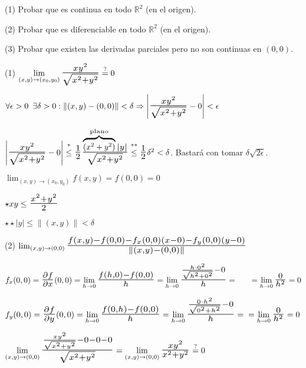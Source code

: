 \documentclass[12pt, titlepage]{article}
\newcommand{\eqc}[1]{\stackrel{\mathclap{\normalfont\mbox{\scriptsize{#1}}}}{=}}
\newcommand{\leqc}[1]{\stackrel{\mathclap{\normalfont\mbox{\scriptsize{#1}}}}{\leq}}
\newcommand{\R}{\mathbb{R}}
\newcommand{\bfrac}[2]{\scalebox{1.4}{$\frac{#1}{#2}$}}
\newcommand{\spac}{\, \, \,}
\begin{document}
(1) Probar que es continua en todo $\R^2$ (en el origen).

(2) Probar que es diferenciable en todo $\R^2$ (en el origen).

(3) Probar que existen las derivadas parciales pero no son continuas en $(0, 0)$.
\vspace{3mm}

(1) $\displaystyle \lim_{(x, y) \to (x_0, y_0)} \bfrac{xy^2}{\sqrt{x^2 + y^2}} \eqc{?} 0$

$\forall \epsilon > 0 \spac \exists \delta > 0 : \|(x , y) - (0, 0)\| < \delta \Rightarrow \left | \bfrac{xy^2}{\sqrt
{x^2 + y^2}} - 0 \right | < \epsilon$
\vspace{3mm}

$\left | \bfrac{xy^2}{\sqrt{x^2 + y^2}} - 0 \right | \leqc{*} \bfrac{1}{2} \bfrac{\overbrace{\scalebox{0.7}{$(x^2 + y^2)$}}^{\text{plano}}|y|}{\sqrt{x^2 + y^2}} \leqc{**} \bfrac{1}{2} \delta^2 < \delta$. Bastará 
con tomar $\delta \sqrt{2 \epsilon}$.
\vspace{3mm}

$\displaystyle \lim_{(x, y) \to (x_0, y_0)} f (x, y) = f (0, 0) = 0$
\vspace{3mm}

$\star xy \leq \bfrac{x^2 + y^2}{2}$
\vspace{2mm}

$\star \star |y| \leq \|(x, y)\| < \delta$
\vspace{5mm}

(2) $\lim_{(x, y) \to (0, 0)} \bfrac{f (x, y) - f (0, 0) - f_x (0, 0) (x - 0) - f_y (0, 0) (y - 0)}{\|(x, y) - (0, 0)\|}$
\vspace{5mm}

$f_x (0, 0) = \bfrac{\partial f}{\partial x} (0, 0) = \displaystyle \lim_{h \to 0} \bfrac{f (h, 0) - f (0, 0)}{h} = 
\lim_{h \to 0} \bfrac{\frac{h \cdot 0^2}{\sqrt{h^2 + 0^2}} - 0}{h} = \\ \indent = \lim_{h \to 0} \bfrac{0}{h^2} = 0$
\vspace{3mm}

$f_y (0, 0) = \bfrac{\partial f}{\partial y} (0, 0)= \displaystyle \lim_{h \to 0} \bfrac{f (0, h) - f (0, 0)}{h} = 
\lim_{h \to 0} \bfrac{\frac{0 \cdot h^2}{\sqrt{0^2 + h^2}} - 0}{h} = \\ = \lim_{h \to 0}  \bfrac{0}{h^2} = 
0$
\vspace{3mm}

$\displaystyle \lim_{(x, y) \to (0, 0)} \bfrac{\frac{xy^2}{\sqrt{x^2 + y^2}} - 0 - 0 - 0}{\sqrt{x^2 + y^2}} = 
\lim_{(x, y) \to (0, 0)} \bfrac{xy^2}{x^2 + y^2} \eqc{?} 0$
\vspace{3mm}
\end{document}

